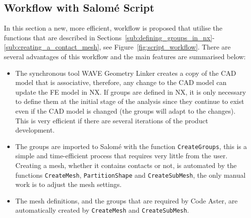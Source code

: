 \subsection{Workflow with Salomé Script} %
\label{sub:workflow_with_salom_script}
In this section a new, more efficient, workflow is proposed that utilise the functions that are described in Sections~\ref{sub:defining_groups_in_nx}-\ref{sub:creating_a_contact_mesh}, see Figure~\ref{fig:script_workflow}. There are several advantages of this workflow and the main features are summarised below:
\begin{itemize}
	\item The synchronous tool WAVE Geometry Linker creates a copy of the CAD model that is associative, therefore, any change to the CAD model can update the FE model in NX. If groups are defined in NX, it is only necessary to define them at the initial stage of the analysis since they continue to exist even if the CAD model is changed (the groups will adapt to the changes). This is very efficient if there are several iterations of the product development.
	\item The groups are imported to Salomé with the function \texttt{CreateGroups}, this is a simple and time-efficient process that requires very little from the user. Creating a mesh, whether it contains contacts or not, is automated by the functions \texttt{CreateMesh}, \texttt{PartitionShape} and \texttt{CreateSubMesh}, the only manual work is to adjust the mesh settings.
	\item The mesh definitions, and the groups that are required by Code Aster, are automatically created by \texttt{CreateMesh} and \texttt{CreateSubMesh}.
\end{itemize}


